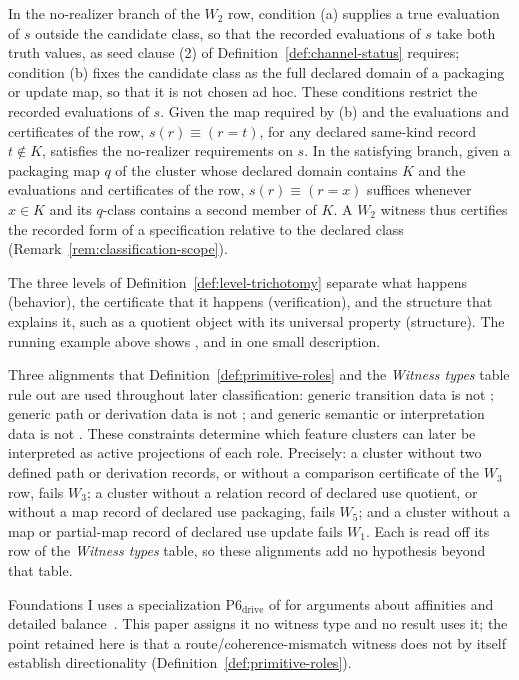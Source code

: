 In the no-realizer branch of the \(W_2\) row, condition (a) supplies a true
evaluation of \(s\) outside the candidate class, so that the recorded
evaluations of \(s\) take both truth values, as seed clause (2) of
Definition~\ref{def:channel-status} requires; condition (b) fixes the candidate
class as the full declared domain of a packaging or update map, so that it is
not chosen ad hoc. These conditions restrict the recorded evaluations of \(s\).
Given the map required by (b) and the evaluations and certificates of the row, \(s(r)\equiv(r=t)\), for any
declared same-kind record \(t\notin K\), satisfies the no-realizer
requirements on \(s\). In the satisfying branch, given a packaging map \(q\) of the cluster whose declared domain contains \(K\) and the evaluations and certificates of the row, \(s(r)\equiv(r=x)\)
suffices whenever \(x\in K\) and its \(q\)-class contains a
second member of \(K\). A \(W_2\) witness thus certifies the recorded form of a
specification relative to the declared class
(Remark~\ref{rem:classification-scope}).

The three levels of Definition~\ref{def:level-trichotomy} separate what
happens (behavior), the certificate that it happens (verification), and
the structure that explains it, such as a quotient object with its
universal property (structure). The running example above shows \Pone{}, \Pfive{} and \Psix{}
in one small description.

\begin{remark}\label{rem:repaired-alignments}
Three alignments that Definition~\ref{def:primitive-roles} and the
\emph{Witness types} table rule out
are used throughout later classification: generic transition data is
not \Pthree{}; generic path or derivation data is not \Pfive{}; and
generic semantic or interpretation data is not \Pone{}. These
constraints determine which feature clusters can later be interpreted
as active projections of each role. Precisely: a cluster without two defined
path or derivation records, or without a comparison certificate of the
\(W_3\) row, fails \(W_3\); a cluster without a relation record of declared use quotient,
or without a map record of declared use packaging, fails \(W_5\); and a cluster without
a map or partial-map record of declared use update fails \(W_1\). Each is read
off its row of the \emph{Witness types} table, so these alignments add no
hypothesis beyond that table.
\end{remark}

\begin{remark}\label{rem:p6-drive}
Foundations I uses a specialization \(\mathrm{P6}_{\mathrm{drive}}\) of
\Psix{} for arguments about affinities and detailed
balance~\citep{Seifert2012}. This paper assigns it no witness type and no
result uses it; the point retained here is that a \Pthree{}
route/coherence-mismatch witness does not by itself establish directionality
(Definition~\ref{def:primitive-roles}).
\end{remark}


